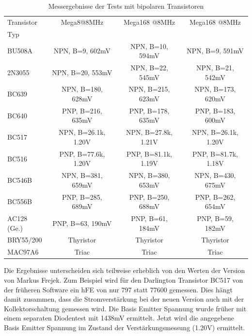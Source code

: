 \begin{table}[H]
  \begin{center}
    \begin{tabular}{| l | c | c | c |}
    \hline
 Transistor & Mega8@8MHz          & Mega168 @8MHz       & Mega168 @8MHz    \\
    Typ     &                     &                     &                  \\
    \hline
    \hline
BU508A      & NPN, B=9, 602mV     & NPN, B=10, 594mV    & NPN, B=9, 591mV   \\
    \hline
2N3055      & NPN, B=20, 553mV    & NPN, B=22, 545mV    & NPN, B=21, 542mV  \\
    \hline
BC639       & NPN, B=180, 628mV   & NPN, B=215, 623mV   & NPN, B=173, 620mV \\
    \hline
BC640       & PNP, B=216, 635mV   & PNP, B=178, 635mV   & PNP, B=183, 600mV \\
    \hline
BC517       & NPN, B=26.1k, 1.20V & NPN, B=27.8k, 1.21V & NPN, B=26.1k, 1.20V\\
    \hline
BC516       & PNP, B=77.6k, 1.20V & PNP, B=81.1k, 1.19V & PNP, B=81.7k, 1.18V\\
    \hline
BC546B      & NPN, B=381, 659mV   & NPN, B=380, 653mV   & NPN, B=430, 675mV \\
    \hline
BC556B      & PNP, B=285, 689mV   & PNP, B=250, 688mV   & PNP, B=262, 654mV \\
    \hline
AC128 (Ge.) & PNP, B=63, 190mV    & PNP, B=61, 184mV    & PNP, B=59, 182mV  \\
    \hline
BRY55/200   & Thyristor           & Thyristor           & Thyristor        \\
    \hline
MAC97A6     & Triac               & Triac               & Triac        \\
    \hline
    \end{tabular}
  \end{center}
  \caption{Messergebnisse der Tests mit bipolaren Transistoren}
  \label{tab:bipolar} 
\end{table}

Die Ergebnisse unterscheiden sich teilweise erheblich von den Werten der Version 
von Markus Frejek. Zum Beispiel wird für den Darlington Transistor BC517 von
der früheren Software ein hFE von nur 797 statt 77600 gemessen. 
Dies hängt damit zusammen, dass die Stromverstärkung bei der neuen Version auch mit der
Kollektorschaltung gemessen wird.
Die Basis Emitter Spannung wurde früher mit einem separaten Diodentest mit 1438mV ermittelt.
Jetzt wird die angegebene Basis Emitter Spannung im Zustand der Verstärkungsmessung (1.20V) ermittelt.

